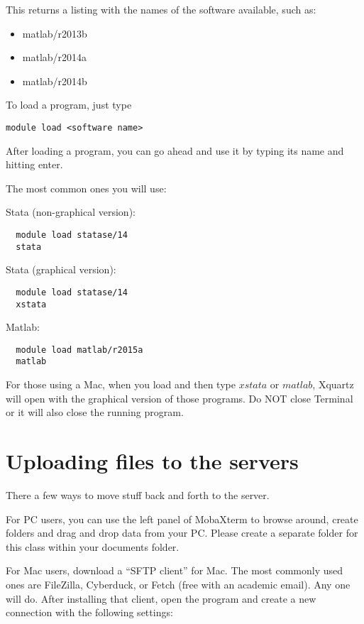 \documentclass[12pt]{article}
\begin{document}
This returns a listing with the names of the software available, such as:

\begin{itemize}
  \item matlab/r2013b
  \item matlab/r2014a
  \item matlab/r2014b
\end{itemize}

To load a program, just type 

\begin{lstlisting}
module load <software name>	
\end{lstlisting}


After loading a program, you can go ahead and use it by typing its name and hitting enter. 

The most common ones you will use:
\bigskip


Stata (non-graphical version):
\begin{lstlisting}
  module load statase/14
  stata
\end{lstlisting}


Stata (graphical version):
\begin{lstlisting}
  module load statase/14
  xstata
\end{lstlisting}

Matlab:
\begin{lstlisting}
  module load matlab/r2015a
  matlab
\end{lstlisting}


For those using a Mac, when you load and then type $xstata$ or $matlab$, Xquartz will open with the graphical version of those programs. Do NOT close Terminal or it will also close the running program.





\section{Uploading files to the servers}

There a few ways to move stuff back and forth to the server.

For PC users, you can use the left panel of MobaXterm to browse around, create folders and drag and drop data from your PC. Please create a separate folder for this class within your documents folder.

For Mac users, download a ``SFTP client'' for Mac. The most commonly used ones are FileZilla, Cyberduck, or Fetch (free with an academic email). Any one will do. After installing that client, open the program and create a new connection with the following settings:
\end{document}
